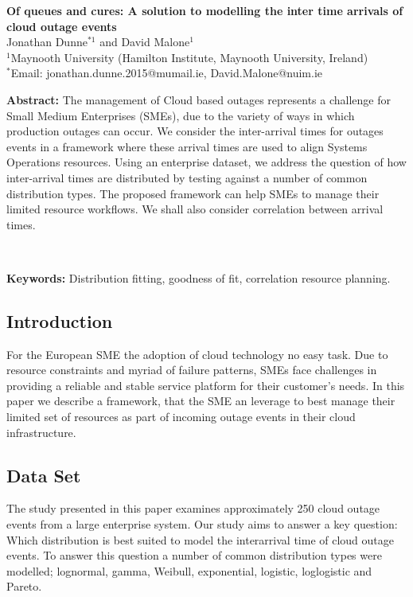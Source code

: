 \documentclass[12pt,a4paper]{article}
\begin{document}
\begin{center}

	\large \textbf{Of queues and cures: A solution to modelling the inter time arrivals of cloud outage events}\\[12pt]

	\normalsize Jonathan Dunne$^{\ast 1}$ and David Malone$^1$ \\[12pt]
	$^1$Maynooth University (Hamilton Institute, Maynooth University, Ireland)\\ 
	$^{\ast}$Email: jonathan.dunne.2015@mumail.ie, David.Malone@nuim.ie \\[24pt]
	
\end{center}

\small \textbf{Abstract:}
The management of Cloud based outages represents a challenge for Small Medium Enterprises (SMEs), due to the variety of ways in which production outages can occur. We consider the inter-arrival times for outages events in a framework where these arrival times are used to align Systems Operations resources. Using an enterprise dataset, we address the question of how inter-arrival times are distributed by testing against a number of common distribution types. The proposed framework can help SMEs to manage their limited resource workflows. We shall also consider correlation between arrival times.

\ \*

\small \textbf{Keywords:} Distribution fitting, goodness of fit, correlation resource planning.
\vspace{-3mm}

\normalsize
\subsection*{Introduction}
For the European SME the adoption of cloud technology no easy task. Due to resource constraints and myriad of failure patterns, SMEs face challenges in providing a reliable and stable service platform for their customer's needs. In this paper we describe a framework, that the SME an leverage to best manage their limited set of resources as part of incoming outage events in their cloud infrastructure. 

\subsection*{Data Set}
The study presented in this paper examines approximately 250 cloud outage events from a large enterprise system. Our study aims to answer a key question: Which distribution is best suited to model the interarrival time of cloud outage events. To answer this question a number of common distribution types were modelled; lognormal, gamma, Weibull, exponential, logistic, loglogistic and Pareto.
\par
\end{document}
